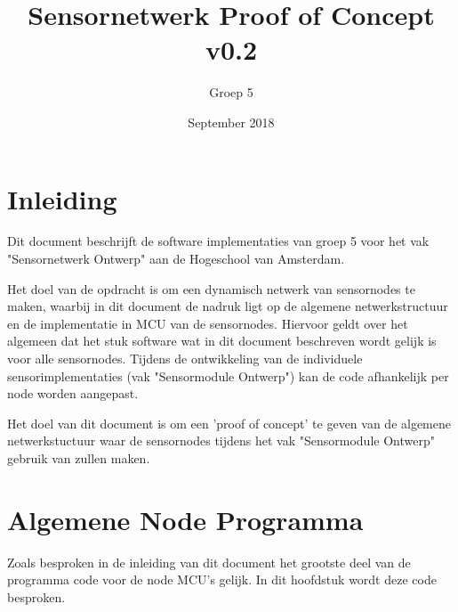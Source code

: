 \documentclass[a4paper, 11pt]{article}
\title{Sensornetwerk Proof of Concept v0.2}
\author{Groep 5}
\date{September 2018}
\begin{document}
\maketitle
\clearpage
{}
\clearpage

\section{Inleiding}
Dit document beschrijft de software implementaties van groep 5 voor het vak "Sensornetwerk Ontwerp" aan de Hogeschool van Amsterdam.

Het doel van de opdracht is om een dynamisch netwerk van sensornodes te maken, waarbij in dit document de nadruk ligt op de algemene netwerkstructuur en de implementatie in MCU van de sensornodes. Hiervoor geldt over het algemeen dat het stuk software wat in dit document beschreven wordt gelijk is voor alle sensornodes. Tijdens de ontwikkeling van de individuele sensorimplementaties (vak "Sensormodule Ontwerp") kan de code afhankelijk per node worden aangepast. 

Het doel van dit document is om een 'proof of concept' te geven van de algemene netwerkstuctuur waar de sensornodes tijdens het vak "Sensormodule Ontwerp" gebruik van zullen maken.

\section{Algemene Node Programma}
Zoals besproken in de inleiding van dit document het grootste deel van de programma code voor de node MCU's gelijk. In dit hoofdstuk wordt deze code besproken. 
\end{document}
